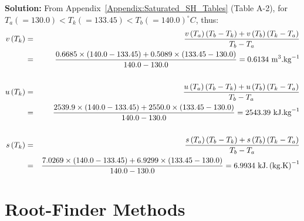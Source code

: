 \begin{list}{\bf Example :~}{}
           {\bf Solution:} From Appendix~\ref{Appendix:Saturated_SH_Tables} (Table A-2), for $T_{a}(=130.0) < T_{k} (= 133.45) < T_{b} (=140.0)^{\circ}C$, thus:
               \begin{eqnarray}
                  v\left(T_{k}\right) &=& \displaystyle\frac{v\left(T_{a}\right)\left(T_{b}-T_{k}\right) + v\left(T_{b}\right)\left(T_{k}-T_{a}\right)}{T_{b}-T_{a}} \nonumber \\
                                     &=& \displaystyle\frac{0.6685\times(140.0-133.45) + 0.5089\times(133.45-130.0)}{140.0-130.0} = 0.6134 \text{ m}^{3}\text{.kg}^{-1}\nonumber \\
                                     && \nonumber \\
                  u\left(T_{k}\right) &=& \displaystyle\frac{u\left(T_{a}\right)\left(T_{b}-T_{k}\right) + u\left(T_{b}\right)\left(T_{k}-T_{a}\right)}{T_{b}-T_{a}} \nonumber \\
                                     &=& \displaystyle\frac{2539.9\times(140.0-133.45) + 2550.0\times(133.45-130.0)}{140.0-130.0} = 2543.39 \text{ kJ.kg}^{-1}\nonumber \\
                                     && \nonumber \\
                  s\left(T_{k}\right) &=& \displaystyle\frac{s\left(T_{a}\right)\left(T_{b}-T_{k}\right) + s\left(T_{b}\right)\left(T_{k}-T_{a}\right)}{T_{b}-T_{a}} \nonumber \\
                                     &=& \displaystyle\frac{7.0269\times(140.0-133.45) + 6.9299\times(133.45-130.0)}{140.0-130.0} = 6.9934 \text{ kJ.}\left(\text{kg.K}\right)^{-1}\nonumber 
               \end{eqnarray}


    \end{list}

\section{Root-Finder Methods}\label{Section:RootFinderMethods}

